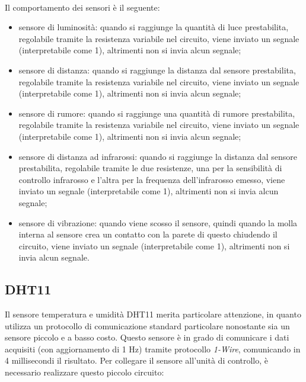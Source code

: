 \documentclass[a4paper,titlepage]{book}
\begin{document}
~

Il comportamento dei sensori è il seguente:

\begin{itemize}[noitemsep,topsep=10pt,parsep=23pt,partopsep=0pt]

\item sensore di luminosità: quando si raggiunge la quantità di luce prestabilita, regolabile tramite la resistenza variabile nel circuito, viene inviato un segnale (interpretabile come 1), altrimenti non si invia alcun segnale;

\item sensore di distanza: quando si raggiunge la distanza dal sensore prestabilita, regolabile tramite la resistenza variabile nel circuito, viene inviato un segnale (interpretabile come 1), altrimenti non si invia alcun segnale;

\item sensore di rumore: quando si raggiunge una quantità di rumore prestabilita, regolabile tramite la resistenza variabile nel circuito, viene inviato un segnale (interpretabile come 1), altrimenti non si invia alcun segnale;

\item sensore di distanza ad infrarossi: quando si raggiunge la distanza dal sensore prestabilita, regolabile tramite le due resistenze, una per la sensibilità di controllo infrarosso e l'altra per la frequenza dell'infrarosso emesso, viene inviato un segnale (interpretabile come 1), altrimenti non si invia alcun segnale;

\item sensore di vibrazione: quando viene scosso il sensore, quindi quando la molla interna al sensore crea un contatto con la parete di questo chiudendo il circuito, viene inviato un segnale (interpretabile come 1), altrimenti non si invia alcun segnale.

\end{itemize} 

\subsection{DHT11}

Il sensore temperatura e umidità DHT11 merita particolare attenzione, in quanto utilizza un protocollo di comunicazione standard particolare nonostante sia un sensore piccolo e a basso costo. Questo sensore è in grado di comunicare i dati acquisiti (con aggiornamento di 1 Hz) tramite protocollo \textit{1-Wire}, comunicando in 4 millisecondi il risultato. Per collegare il sensore all'unità di controllo, è necessario realizzare questo piccolo circuito:
\end{document}
